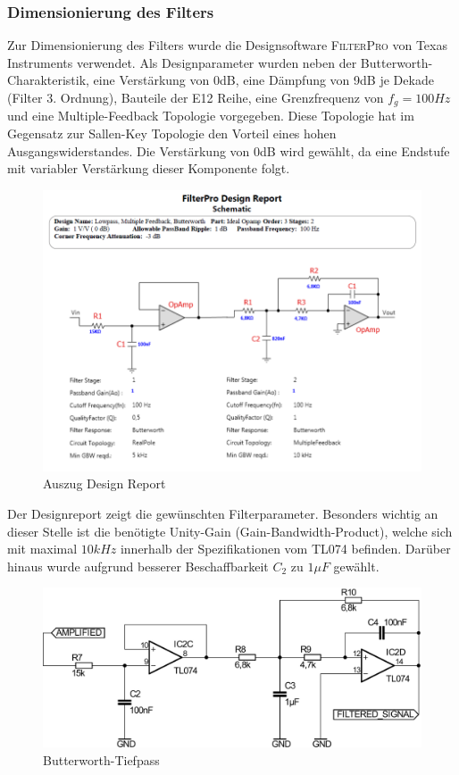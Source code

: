 \subsubsection{Dimensionierung des Filters}
Zur Dimensionierung des Filters wurde die Designsoftware \textsc{FilterPro} von Texas Instruments verwendet. Als Designparameter wurden neben der Butter\-worth-Charakteristik, eine Verstärkung von 0dB, eine Dämpfung von 9dB je Dekade (Filter 3. Ordnung), Bauteile der E12 Reihe, eine Grenzfrequenz von $f_g=100Hz$ und eine Multiple-Feedback Topologie vorgegeben. Diese Topologie hat im Gegensatz zur Sallen-Key Topologie den Vorteil eines hohen Ausgangswiderstandes. Die Verstärkung von 0dB wird gewählt, da eine Endstufe mit variabler Verstärkung dieser Komponente folgt.
\begin{figure}[H]
	\centering
	\includegraphics[scale=0.575]{gfx/Butterworth_FilterPro.png}
	\caption{Auszug Design Report}
	\label{fig:design_report}
\end{figure}
\noindent
Der Designreport zeigt die gewünschten Filterparameter. Besonders wichtig an dieser Stelle ist die benötigte Unity-Gain (Gain-Bandwidth-Product), welche sich mit maximal $10kHz$ innerhalb der Spezifikationen vom \textsc{TL074} befinden. Darüber hinaus wurde aufgrund besserer Beschaffbarkeit $C_2$ zu $1\mu F$ gewählt.
\begin{figure}[H]
	\centering
	\includegraphics[scale=0.5]{gfx/filter.pdf}
	\caption{Butterworth-Tiefpass}
\end{figure}

